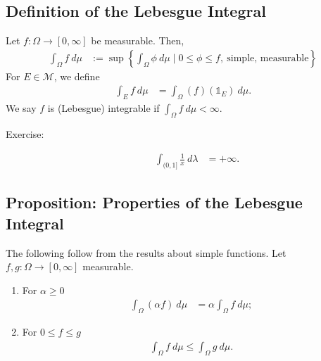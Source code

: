 \documentclass[9pt]{extarticle}
\begin{document}
  \subsection{Definition of the Lebesgue Integral}%
  Let $f: \Omega \rightarrow [0,\infty]$ be measurable. Then,
  \begin{align*}
    \int_{\Omega} f~d\mu &:= \sup \left\{\int_{\Omega}\phi~d\mu\mid 0\leq \phi \leq f,~\text{simple, measurable}\right\}
  \end{align*}
  For $E\in \mathcal{M}$, we define
  \begin{align*}
    \int_{E}f~d\mu &= \int_{\Omega}(f)\left(\mathbb{1}_E\right)~d\mu.
  \end{align*}
  We say $f$ is (Lebesgue) integrable if $\int_{\Omega}f~d\mu < \infty$.
  \begin{description}
    \item[Exercise:]
      \begin{align*}
        \int_{(0,1]}\frac{1}{x}~d\lambda &= +\infty.
      \end{align*}
  \end{description}
  \subsection{Proposition: Properties of the Lebesgue Integral}%
  The following follow from the results about simple functions. Let $f,g: \Omega \rightarrow [0,\infty]$ measurable.
  \begin{enumerate}[(1)]
    \item For $\alpha \geq 0$
      \begin{align*}
        \int_{\Omega}(\alpha f)~d\mu &= \alpha \int_{\Omega}f~d\mu;
      \end{align*}
    \item For $0\leq f \leq g$
      \begin{align*}
        \int_{\Omega} f~d\mu \leq \int_{\Omega}g~d\mu.
      \end{align*}
  \end{enumerate}
\end{document}
